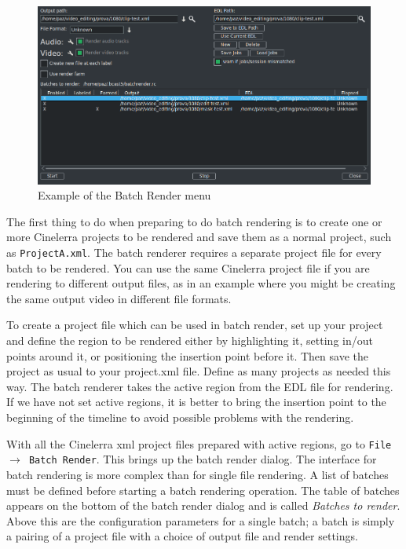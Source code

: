\begin{figure}[htpb]
    \centering
    \includegraphics[width=0.8\linewidth]{images/batch01.png}
    \caption{Example of the Batch Render menu}
    \label{fig:batch01}
\end{figure}

The first thing to do when preparing to do batch rendering is to create one or more Cinelerra projects to be rendered and save them as a normal project, such as \texttt{ProjectA.xml}.  The batch renderer requires a separate project file for every batch to be rendered.  You can use the same Cinelerra project file if you are rendering to different output files, as in an example where you might be creating the same output video in different file formats.

To create a project file which can be used in batch render, set up your project and define the region to be rendered either by highlighting it, setting in/out points around it, or positioning the insertion point before it. Then save the project as usual to your project.xml file. Define as many projects as needed this way.  The batch renderer takes the active region from the EDL file for rendering. If we have not set active regions, it is better to bring the insertion point to the beginning of the timeline to avoid possible problems with the rendering.

With all the Cinelerra xml project files prepared with active regions, go to \texttt{File $\rightarrow$ Batch Render}. This brings up the batch render dialog. The interface for batch rendering is more complex than for single file rendering.  A list of batches must be defined before starting a batch rendering operation.  The table of batches appears on the bottom of the batch render dialog and is called \textit{Batches to render}.  Above this are the configuration parameters for a single batch; a batch is simply a pairing of a project file with a choice of output file and render settings.

